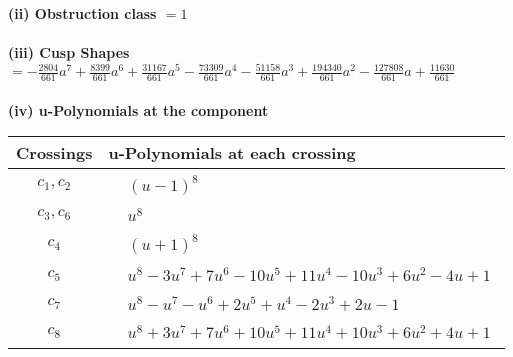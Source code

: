 \documentclass[1p]{elsarticle_modified}
\theoremstyle{definition}
\begin{document}
\flushleft \textbf{(ii) Obstruction class $= 1$}\\~\\
\flushleft \textbf{(iii) Cusp Shapes $= -\frac{2804}{661} a^7+\frac{8399}{661} a^6+\frac{31167}{661} a^5-\frac{73309}{661} a^4-\frac{51158}{661} a^3+\frac{194340}{661} a^2-\frac{127808}{661} a+\frac{11630}{661}$}\\~\\
\newpage\renewcommand{\arraystretch}{1}
\flushleft \textbf{(iv) u-Polynomials at the component}\newline \\
\begin{tabular}{m{50pt}|m{274pt}}
Crossings & \hspace{64pt}u-Polynomials at each crossing \\
\hline $$\begin{aligned}c_{1},c_{2}\end{aligned}$$&$\begin{aligned}
&(u-1)^8
\end{aligned}$\\
\hline $$\begin{aligned}c_{3},c_{6}\end{aligned}$$&$\begin{aligned}
&u^8
\end{aligned}$\\
\hline $$\begin{aligned}c_{4}\end{aligned}$$&$\begin{aligned}
&(u+1)^8
\end{aligned}$\\
\hline $$\begin{aligned}c_{5}\end{aligned}$$&$\begin{aligned}
&u^8-3 u^7+7 u^6-10 u^5+11 u^4-10 u^3+6 u^2-4 u+1
\end{aligned}$\\
\hline $$\begin{aligned}c_{7}\end{aligned}$$&$\begin{aligned}
&u^8- u^7- u^6+2 u^5+u^4-2 u^3+2 u-1
\end{aligned}$\\
\hline $$\begin{aligned}c_{8}\end{aligned}$$&$\begin{aligned}
&u^8+3 u^7+7 u^6+10 u^5+11 u^4+10 u^3+6 u^2+4 u+1
\end{aligned}$\\

\end{tabular}
\end{document}

